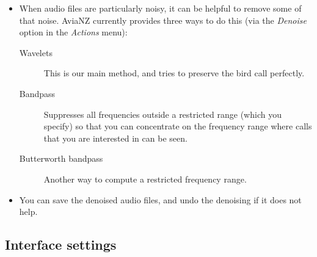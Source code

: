 \documentclass{scrartcl}
\begin{document}
\begin{itemize}
	\item When audio files are particularly noisy, it can be helpful to remove some of that noise. AviaNZ currently provides three ways to do this (via the \textit{Denoise} option in the \textit{Actions} menu):
\begin{description}
\item[Wavelets] This is our main method, and tries to preserve the bird call perfectly. 
\item[Bandpass] Suppresses all frequencies outside a restricted range (which you specify) so that you can concentrate on the frequency range where calls that you are interested in can be seen.
\item[Butterworth bandpass] Another way to compute a restricted frequency range.
\end{description}
\item You can save the denoised audio files, and undo the denoising if it does not help.
\end{itemize}

\subsection{Interface settings}\label{sec:interfacesettings}
\end{document}
